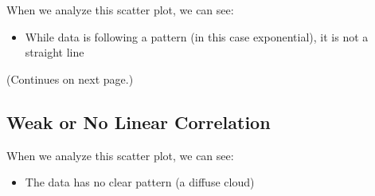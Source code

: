 \documentclass{article}
\begin{document}
When we analyze this scatter plot, we can see:
\begin{itemize}
       \item While data is following a pattern (in this case exponential), it is not a straight line
\end{itemize}
\vfill
\begin{center}
       (Continues on next page.)
\end{center}

\newpage
\subsection{Weak or No Linear Correlation}
\begin{center}
\end{center}

When we analyze this scatter plot, we can see:
\begin{itemize}
       \item The data has no clear pattern (a diffuse cloud)
\end{itemize}
\end{document}
